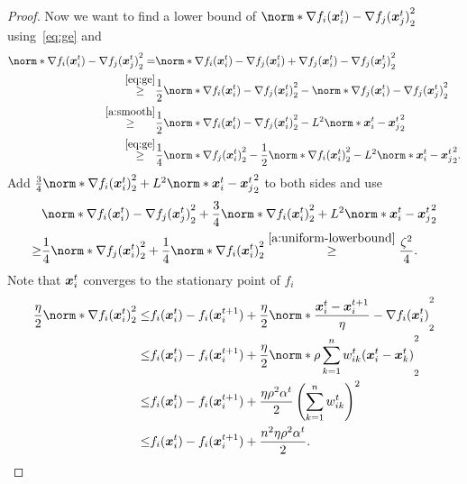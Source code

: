 \documentclass{article}
\begin{document}
\begin{proof}
  Now we want to find a lower bound of $\norm*{\nabla f_i(\xx^t_i) - \nabla f_j(\xx^t_j)}_2^2$ using~\eqref{eq:ge} and 
  \begin{align*}
    \norm*{\nabla f_i(\xx^t_i) - \nabla f_j(\xx^t_j)}_2^2
    =& \norm*{\nabla f_i(\xx^t_i) - \nabla f_j(\xx^t_i) + \nabla f_j(\xx^t_i) - \nabla f_j(\xx^t_j)}_2^2 \\
    \stackrel{\eqref{eq:ge}}{\ge}& \frac{1}{2} \norm*{\nabla f_i(\xx^t_i) - \nabla f_j(\xx^t_i)}_2^2
    - \norm*{\nabla f_j(\xx^t_i) - \nabla f_j(\xx^t_j)}_2^2 \\
    \stackrel{\Cref{a:smooth}}{\ge}& \frac{1}{2} \norm*{\nabla f_i(\xx^t_i) - \nabla f_j(\xx^t_i)}_2^2
    - L^2\norm*{\xx^t_i - \xx^t_j}_2^2 \\
    \stackrel{\eqref{eq:ge}}{\ge}& \frac{1}{4} \norm*{\nabla f_j(\xx^t_i)}_2^2 - \frac{1}{2}\norm*{\nabla f_i(\xx^t_i)}_2^2
    - L^2\norm*{\xx^t_i - \xx^t_j}_2^2.
  \end{align*}
  Add $\frac{3}{4}\norm*{\nabla f_i(\xx^t_i)}_2^2 + L^2\norm*{\xx^t_i - \xx^t_j}_2^2$ to both sides and use 
  \begin{equation}\label{eq:lower-bound:2}
    \begin{split}
    &\norm*{\nabla f_i(\xx^t_i) - \nabla f_j(\xx^t_j)}_2^2
    + \frac{3}{4} \norm*{\nabla f_i(\xx^t_i)}_2^2
    + L^2\norm*{\xx^t_i - \xx^t_j}_2^2 \\
    \ge& \frac{1}{4} \norm*{\nabla f_j(\xx^t_i)}_2^2
    + \frac{1}{4} \norm*{\nabla f_i(\xx^t_i)}_2^2
    \stackrel{\Cref{a:uniform-lowerbound}}{\ge} \frac{\zeta^2}{4}.
    \end{split}
  \end{equation}
  Note that $\bm{x}_i^t$ converges to the stationary point of $f_i$
  \begin{equation}\label{eq:lower-bound:3}
    \begin{split}
    \frac{\eta}{2} \norm*{\nabla f_i(\xx^t_i)}_2^2
    \le& f_i(\xx_i^t) - f_i(\xx_i^{t+1}) + \frac{\eta}{2} \norm*{\frac{\xx_i^t - \xx_i^{t+1}}{\eta} - \nabla f_i(\xx^t_i)}_2^2 \\
    \le& f_i(\xx_i^t) - f_i(\xx_i^{t+1}) + \frac{\eta}{2} \norm*{\rho \sum_{k=1}^n w^t_{ik}(\xx^t_i - \xx^t_k)}_2^2 \\
    \le& f_i(\xx_i^t) - f_i(\xx_i^{t+1}) + \frac{\eta\rho^2\alpha^t}{2}
    \left(\sum_{k=1}^n w^t_{ik}\right)^2 \\ 
    \le& f_i(\xx_i^t) - f_i(\xx_i^{t+1}) + \frac{n^2 \eta\rho^2\alpha^t}{2}.
    \end{split}

\end{equation}
\end{proof}
\end{document}
